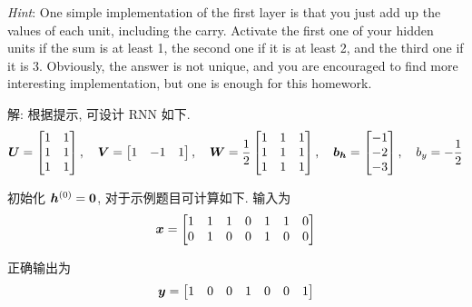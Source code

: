 \documentclass{article}
\begin{document}
\emph{Hint}: One simple implementation of the first layer is that you just add up the values of each unit, including the carry. Activate the first one of your hidden units if the sum is at least 1, the second one if it is at least 2, and the third one if it is 3. Obviously, the answer is not unique, and you are encouraged to find more interesting implementation, but one is enough for this homework.

解: 根据提示, 可设计 RNN 如下.
\begin{equation}
  \bm{U}=\begin{bmatrix}
    1 & 1 \\
    1 & 1 \\
    1 & 1 \\
  \end{bmatrix},\quad
  \bm{V}=\begin{bmatrix}
    1 & -1 & 1 \\
  \end{bmatrix},\quad
  \bm{W}=\frac{1}{2}\begin{bmatrix}
    1 & 1 & 1 \\
    1 & 1 & 1 \\
    1 & 1 & 1 \\
  \end{bmatrix},\quad
  \bm{b}_{\bm{h}}=\begin{bmatrix}
    -1 \\ -2 \\ -3 \\
  \end{bmatrix},\quad
  b_y=-\frac{1}{2}
\end{equation}

初始化 $\bm{h}^{(0)}=\bm{0}$, 对于示例题目可计算如下. 输入为
\begin{equation}
  \bm{x}=\begin{bmatrix}
    1 & 1 & 1 & 0 & 1 & 1 & 0 \\
    0 & 1 & 0 & 0 & 1 & 0 & 0 \\
  \end{bmatrix}
\end{equation}

正确输出为
\begin{equation}
  \bm{y}=\begin{bmatrix}
    1 & 0 & 0 & 1 & 0 & 0 & 1 \\
  \end{bmatrix}
\end{equation}
\end{document}
